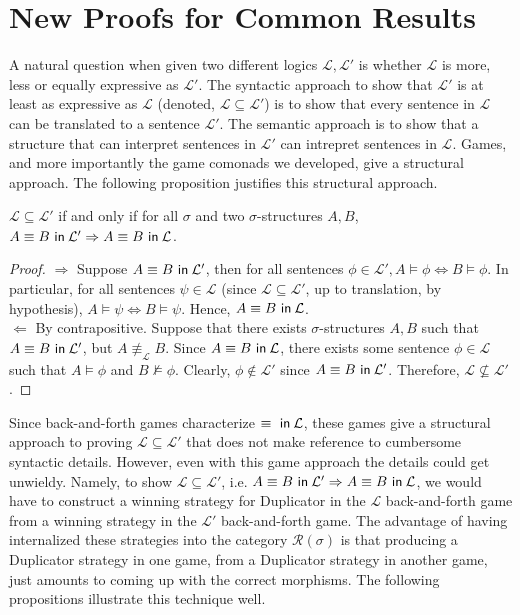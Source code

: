 \section{New Proofs for Common Results}\label{sec:commonResults}
A natural question when given two different logics $\mathcal{L},\mathcal{L'}$ is whether $\mathcal{L}$ is more, less or equally expressive as $\mathcal{L'}$. The syntactic approach to show that $\mathcal{L'}$ is at least as expressive as $\mathcal{L}$ (denoted, $\mathcal{L} \subseteq \mathcal{L'}$) is to show that every sentence in $\mathcal{L}$ can be translated to a sentence $\mathcal{L'}$. The semantic approach is to show that a structure that can interpret sentences in $\mathcal{L'}$ can intrepret sentences in $\mathcal{L}$. Games, and more importantly the game comonads we developed, give a structural approach. The following proposition justifies this structural approach. 
\begin{prop}
$\mathcal{L} \subseteq \mathcal{L'}$ if and only if for all $\sigma$ and two $\sigma$-structures $A,B$, ${A \equiv B \ \mathsf{in}\: \mathcal{L'}} \Rightarrow {A \equiv B \ \mathsf{in}\: \mathcal{L}}$.
\begin{proof}
$\Rightarrow$ Suppose ${A \equiv B \ \mathsf{in}\: \mathcal{L'}}$, then for all sentences $\phi \in \mathcal{L'}, A \vDash \phi \Leftrightarrow B \vDash \phi$. In particular, for all sentences $\psi \in \mathcal{L}$ (since $\mathcal{L} \subseteq \mathcal{L'}$, up to translation, by hypothesis), $A \vDash \psi \Leftrightarrow B \vDash \psi$. Hence, ${A \equiv B \ \mathsf{in}\: \mathcal{L}}$.\\
$\Leftarrow$ By contrapositive. Suppose that there exists $\sigma$-structures $A,B$ such that ${A \equiv B \ \mathsf{in}\: \mathcal{L'}}$, but $A \not\equiv_{\mathcal{L}} B$. Since ${A \equiv B \ \mathsf{in}\: \mathcal{L}}$, there exists some sentence $\phi \in \mathcal{L}$ such that $A \vDash \phi$ and $B \not\vDash \phi$. Clearly, $\phi \not\in \mathcal{L'}$ since ${A \equiv B \ \mathsf{in}\: \mathcal{L'}}$. Therefore, $\mathcal{L} \not\subseteq \mathcal{L'}$.
\end{proof}
\label{prop:inclusionToEquiv}
\end{prop}
Since back-and-forth games characterize ${ \equiv  \ \mathsf{in}\: \mathcal{L}}$, these games give a structural approach to proving $\mathcal{L} \subseteq \mathcal{L'}$ that does not make reference to cumbersome syntactic details. However, even with this game approach the details could get unwieldy. Namely, to show $\mathcal{L} \subseteq \mathcal{L'}$, i.e. ${A \equiv B \ \mathsf{in}\: \mathcal{L'}} \Rightarrow {A \equiv B \ \mathsf{in}\: \mathcal{L}}$, we would have to construct a winning strategy for Duplicator in the $\mathcal{L}$ back-and-forth game from a winning strategy in the $\mathcal{L'}$ back-and-forth game. The advantage of having internalized these strategies into the category $\mathcal{R}(\sigma)$ is that producing a Duplicator strategy in one game, from a Duplicator strategy in another game, just amounts to coming up with the correct morphisms. The following propositions illustrate this technique well. \\~\\
